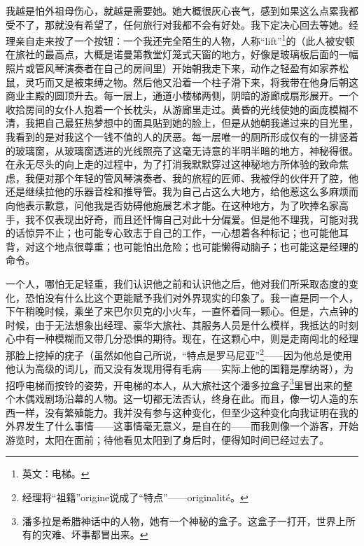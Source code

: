 \par 我越是怕外祖母伤心，就越是需要她。她大概很灰心丧气，感到如果这么点累我都受不了，那就没有希望了，任何旅行对我都不会有好处。我下定决心回去等她。经理亲自走来按了一个按钮：一个我还完全陌生的人物，人称“lift”\footnote{英文：电梯。}的（此人被安顿在旅社的最高点，大概是诺曼第教堂灯笼式天窗的地方，好像是玻璃板后面的一幅照片或管风琴演奏者在自己的房间里）开始朝我走下来，动作之轻盈有如家养松鼠，灵巧而又是被束缚之物。然后他又沿着一个柱子滑下来，将我带在他身后朝这商业主殿的圆顶升去。每一层上，通道小楼梯两侧，阴暗的游廊成扇形展开。一个收拾房间的女仆人抱着一个长枕头，从游廊里走过。黄昏的光线使她的面庞模糊不清，我把自己最狂热梦想中的面具贴到她的脸上，但是从她朝我递过来的目光里，我看到的是对我这个一钱不值的人的厌恶。每一层唯一的厕所形成仅有的一排竖着的玻璃窗，从玻璃窗透进的光线照亮了这毫无诗意的半明半暗的地方，神秘得很。在永无尽头的向上走的过程中，为了打消我默默穿过这神秘地方所体验的致命焦虑，我便对那个年轻的管风琴演奏者、我的旅程的匠师、我被俘的伙伴开了腔，他还是继续拉他的乐器音栓和推导管。我为自己占这么大地方，给他惹这么多麻烦而向他表示歉意，问他我是否妨碍他施展艺术才能。在这种地方，为了吹捧名家高手，我不仅表现出好奇，而且还忏悔自己对此十分偏爱。但是他不理我，可能对我的话惊异不止；也可能专心致志于自己的工作，一心想着各种标记；也可能他耳背，对这个地点很尊重；也可能怕出危险；也可能懒得动脑子；也可能这是经理的命令。
\par 一个人，哪怕无足轻重，我们认识他之前和认识他之后，他对我们所采取态度的变化，恐怕没有什么比这个更能赋予我们对外界现实的印象了。我一直是同一个人，下午稍晚时候，乘坐了来巴尔贝克的小火车，一直怀着同一颗心。但是，六点钟的时候，由于无法想象出经理、豪华大旅社、其服务人员是什么模样，我抵达的时刻心中有一种模糊而又带几分恐惧的期待。现在，在这颗心中，则是走南闯北的经理那脸上挖掉的疣子（虽然如他自己所说，“特点是罗马尼亚”\footnote{经理将“祖籍”origine说成了“特点”——originalité。}——因为他总是使用他认为高级的词儿，而又没有发现用得有毛病——实际上他的国籍是摩纳哥），为招呼电梯而按铃的姿势，开电梯的本人，从大旅社这个潘多拉盒子\footnote{潘多拉是希腊神话中的人物，她有一个神秘的盒子。这盒子一打开，世界上所有的灾难、坏事都冒出来。}里冒出来的整个木偶戏剧场沿幕的人物。这一切都无法否认，终身在此。而且，像一切人造的东西一样，没有繁殖能力。我并没有参与这种变化，但至少这种变化向我证明在我的外界发生了什么事情——这事情毫无意义，是自在的——而我则像一个游客，开始游览时，太阳在面前；待他看见太阳到了身后时，便得知时间已经过去了。
